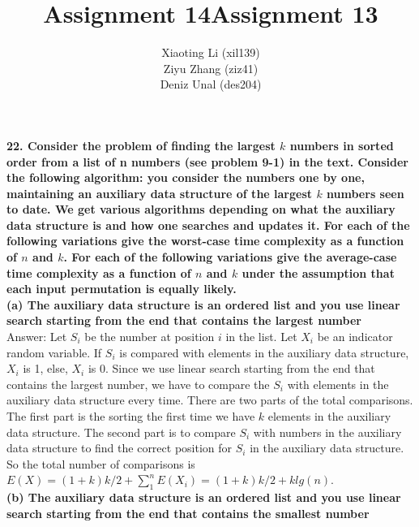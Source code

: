 \documentclass{article}
\title{Assignment 14}
\title{Assignment 13}
\author{Xiaoting Li (xil139) \\
Ziyu Zhang (ziz41) \\
Deniz Unal (des204)}
\date{}
\begin{document}
\maketitle

\noindent
\textbf{22. Consider the problem of finding the largest $k$ numbers in sorted order from a list of n numbers (see problem 9-1) in the text. Consider the following algorithm: you consider the numbers one by one, maintaining an auxiliary data structure of the largest $k$ numbers seen to date. We get various algorithms depending on what the auxiliary data structure is and how one searches and updates it. For each of the following variations give the worst-case time complexity as a function of $n$ and $k$. For each of the following variations give the average-case time complexity as a function of $n$ and $k$ under the assumption that each input permutation is equally likely.}\\ \newline
\textbf{(a) The auxiliary data structure is an ordered list and you use linear search starting from the end that contains the largest number} \\ \newline
Answer: Let $S_i$ be the number at position $i$ in the list. Let $X_i$ be an indicator random variable. If $S_i$ is compared with elements in the auxiliary data structure, $X_i$ is 1, else, $X_i$ is 0. Since we use linear search starting from the end that contains the largest number, we have to compare the $S_i$ with elements in the auxiliary data structure every time. There are two parts of the total comparisons. The first part is the sorting the first time we have $k$ elements in the auxiliary data structure. The second part is to compare $S_i$ with numbers in the auxiliary data structure to find the correct position for $S_i$ in the auxiliary data structure. So the total number of comparisons is $E(X) = (1+k)k/2 + \sum_{1}^{n}E(X_i) = (1+k)k/2 + klg(n)$.\\ \newline
\textbf{(b) The auxiliary data structure is an ordered list and you use linear search starting from the end that contains the smallest number} \\ \newline
\end{document}
